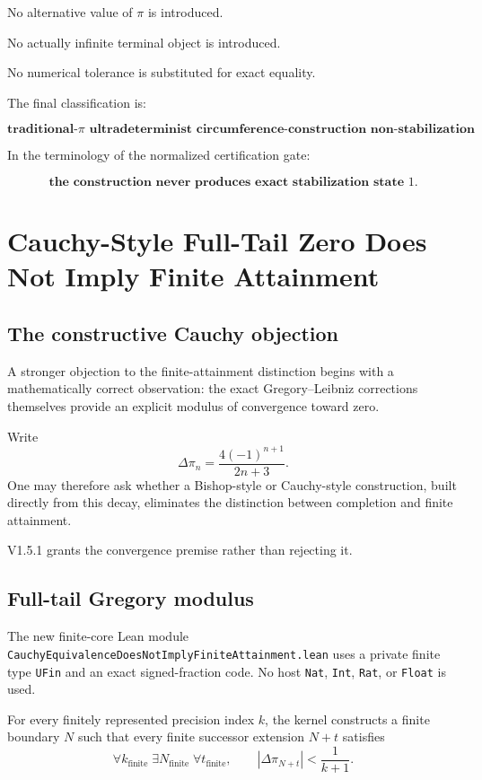 \documentclass[11pt,a4paper]{article}
\begin{document}
No alternative value of \(\pi\) is introduced.

No actually infinite terminal object is introduced.

No numerical tolerance is substituted for exact equality.

The final classification is:

\[
\boxed{
\textbf{traditional-\(\pi\) ultradeterminist circumference-construction non-stabilization}.
}
\]

In the terminology of the normalized certification gate:

\[
\boxed{
\textbf{the construction never produces exact stabilization state \(1\).}
}
\]




\section{Cauchy-Style Full-Tail Zero Does Not Imply Finite Attainment}
\label{sec:cauchy-finite-attainment}

\subsection{The constructive Cauchy objection}

A stronger objection to the finite-attainment distinction begins with
a mathematically correct observation: the exact Gregory--Leibniz
corrections themselves provide an explicit modulus of convergence
toward zero.

Write
\[
\Delta\pi_n
=
\frac{4(-1)^{n+1}}{2n+3}.
\]
One may therefore ask whether a Bishop-style or Cauchy-style
construction, built directly from this decay, eliminates the
distinction between completion and finite attainment.

V1.5.1 grants the convergence premise rather than rejecting it.

\subsection{Full-tail Gregory modulus}

The new finite-core Lean module
\texttt{CauchyEquivalenceDoesNotImplyFiniteAttainment.lean}
uses a private finite type \texttt{UFin} and an exact signed-fraction
code.  No host \texttt{Nat}, \texttt{Int}, \texttt{Rat}, or
\texttt{Float} is used.

For every finitely represented precision index \(k\), the kernel
constructs a finite boundary \(N\) such that every finite successor
extension \(N+t\) satisfies
\[
\boxed{
\forall k_{\mathrm{finite}}\;
\exists N_{\mathrm{finite}}\;
\forall t_{\mathrm{finite}},
\qquad
|\Delta\pi_{N+t}|
<
\frac{1}{k+1}.
}
\]
\end{document}
